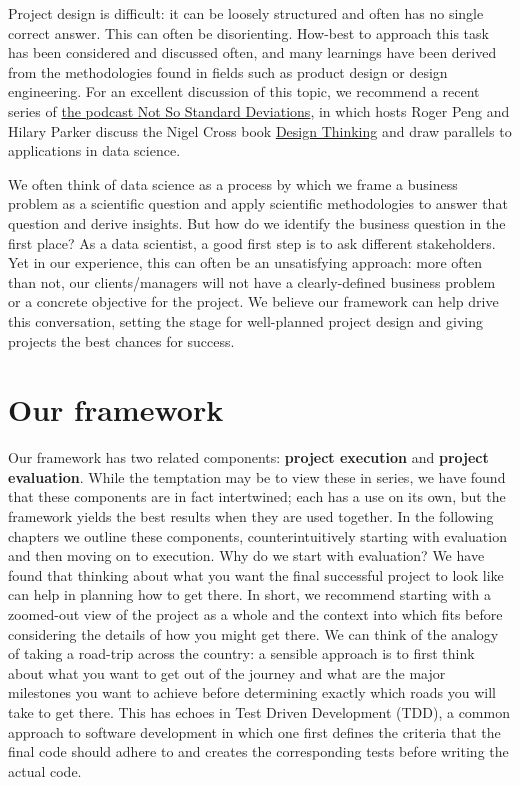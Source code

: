 \documentclass[
]{book}
\begin{document}
Project design is difficult: it can be loosely structured and often has no single correct answer. This can often be disorienting. How-best to approach this task has been considered and discussed often, and many learnings have been derived from the methodologies found in fields such as product design or design engineering. For an excellent discussion of this topic, we recommend a recent series of \href{http://nssdeviations.com/108-it-depends}{the podcast Not So Standard Deviations}, in which hosts Roger Peng and Hilary Parker discuss the Nigel Cross book \href{https://www.amazon.co.uk/Design-Thinking-Understanding-Designers-Blac14/dp/1847886361/ref=sr_1_2?keywords=Nigel+Cross+book+Design+Thinking\&qid=1576333690\&sr=8-2}{Design Thinking} and draw parallels to applications in data science.

We often think of data science as a process by which we frame a business problem as a scientific question and apply scientific methodologies to answer that question and derive insights. But how do we identify the business question in the first place? As a data scientist, a good first step is to ask different stakeholders. Yet in our experience, this can often be an unsatisfying approach: more often than not, our clients/managers will not have a clearly-defined business problem or a concrete objective for the project. We believe our framework can help drive this conversation, setting the stage for well-planned project design and giving projects the best chances for success.

\hypertarget{our-framework}{%
\section{Our framework}\label{our-framework}}

Our framework has two related components: \textbf{project execution} and \textbf{project evaluation}. While the temptation may be to view these in series, we have found that these components are in fact intertwined; each has a use on its own, but the framework yields the best results when they are used together. In the following chapters we outline these components, counterintuitively starting with evaluation and then moving on to execution. Why do we start with evaluation? We have found that thinking about what you want the final successful project to look like can help in planning how to get there. In short, we recommend starting with a zoomed-out view of the project as a whole and the context into which fits before considering the details of how you might get there. We can think of the analogy of taking a road-trip across the country: a sensible approach is to first think about what you want to get out of the journey and what are the major milestones you want to achieve before determining exactly which roads you will take to get there. This has echoes in Test Driven Development (TDD), a common approach to software development in which one first defines the criteria that the final code should adhere to and creates the corresponding tests before writing the actual code.
\end{document}
